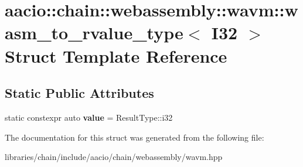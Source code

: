 \hypertarget{structaacio_1_1chain_1_1webassembly_1_1wavm_1_1wasm__to__rvalue__type_3_01_i32_01_4}{}\section{aacio\+:\+:chain\+:\+:webassembly\+:\+:wavm\+:\+:wasm\+\_\+to\+\_\+rvalue\+\_\+type$<$ I32 $>$ Struct Template Reference}
\label{structaacio_1_1chain_1_1webassembly_1_1wavm_1_1wasm__to__rvalue__type_3_01_i32_01_4}
\subsection*{Static Public Attributes}
\begin{DoxyCompactItemize}
\item 
\mbox{\label{structaacio_1_1chain_1_1webassembly_1_1wavm_1_1wasm__to__rvalue__type_3_01_i32_01_4_a7290f6ab520ca8cc0d0fee2ab9dda585}} 
static constexpr auto {\bfseries value} = Result\+Type\+::i32
\end{DoxyCompactItemize}


The documentation for this struct was generated from the following file\+:\begin{DoxyCompactItemize}
\item 
libraries/chain/include/aacio/chain/webassembly/wavm.\+hpp\end{DoxyCompactItemize}
